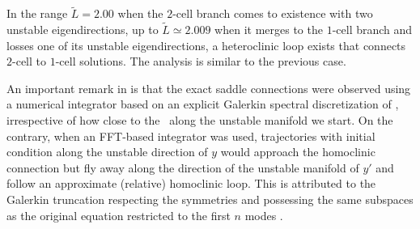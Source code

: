 \begin{description}
In the range $\tilde{L}=2.00$ when the $2$-cell branch comes to
existence with two unstable eigendirections, up to $\tilde{L}
\simeq 2.009$ when it merges to the $1$-cell branch and losses
one of its unstable eigendirections, a heteroclinic loop exists
that connects $2$-cell to $1$-cell solutions. The analysis is
similar to the previous case.

 An important remark in  is that the exact
 saddle connections were observed using a numerical integrator
 based on an explicit Galerkin spectral discretization of \KSe,
 irrespective of how close to the \eqv\ along the unstable
 manifold we start. On the contrary, when an FFT-based
 integrator was used, trajectories with initial condition along
 the unstable direction of $y$ would approach the homoclinic
 connection but fly away along the direction of the unstable
 manifold of $y'$ and follow an approximate (relative)
 homoclinic loop. This is attributed to the Galerkin truncation
 respecting the symmetries and possessing the same subspaces as
 the original equation restricted to the first $n$ modes
 .

\end{description}
